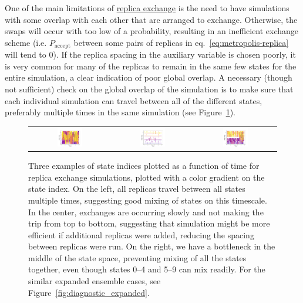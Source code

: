 \documentclass[9pt,review]{livecoms}
\begin{document}
One of the main limitations of \hyperlink{ref:ReplEx} {replica exchange} is the need to have simulations with some overlap with each other that are arranged to exchange. Otherwise, the swaps will occur with too low of a probability, resulting in an inefficient exchange scheme (i.e. $P_\mathrm{accept}$ between some pairs of replicas in eq.~\ref{eq:metropolis-replica} will tend to $0$). If the replica spacing in the auxiliary variable is chosen poorly, it is very common for many of the replicas to remain in the same few states for the entire simulation, a clear indication of poor global overlap. A necessary (though not sufficient) check on the global overlap of the simulation is to make sure that each individual simulation can travel between all of the different states, preferably multiple times in the same simulation (see Figure~\ref{fig:diagnostic_replica}).

\begin{figure}[!ht]
    \centering
\begin{tabular}{c|c|c}
\includegraphics[width=0.33\textwidth]{Figures/diagnostic_figures/goodmixing.png} & \includegraphics[width=0.33\textwidth]{Figures/diagnostic_figures/slowmixing.png}&
\includegraphics[width=0.33\textwidth]{Figures/diagnostic_figures/sepmixing.png} 
\end{tabular}
    \caption{Three examples of state indices plotted as a function of time for replica exchange simulations, plotted with a color gradient on the state index.  On the left, all replicas travel between all states multiple times, suggesting good mixing of states on this timescale.  In the center, exchanges are occurring slowly and not making the trip from top to bottom, suggesting that simulation might be more efficient if additional replicas were added, reducing the spacing between replicas were run. On the right, we have a bottleneck in the middle of the state space, preventing mixing of all the states together, even though states 0--4 and 5--9 can mix readily. For the similar expanded ensemble cases, see Figure~\ref{fig:diagnostic_expanded}.}
    \label{fig:diagnostic_replica}
\end{figure}
\end{document}
